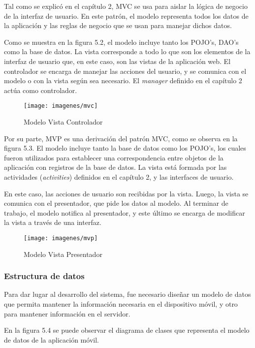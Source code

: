 Tal como se explicó en el capítulo 2, MVC se usa para aislar la lógica de negocio de la interfaz de usuario. En este patrón, el modelo representa todos los datos de la aplicación y las reglas de negocio que se usan para manejar dichos datos. 

Como se muestra en la figura 5.2, el modelo incluye tanto los POJO's, DAO's como la base de datos. La vista corresponde a todo lo que son los elementos de la interfaz de usuario que, en este caso, son las vistas de la aplicación web. El controlador se encarga de manejar las acciones del usuario, y se comunica con el modelo o con la vista según sea necesario. El \textit{manager} definido en el capítulo 2 actúa como controlador.

\begin{figure}[ht]
  \centering
  \texttt{[image: imagenes/mvc]}
  \caption{Modelo Vista Controlador}
  \label{fig:mvc}
\end{figure}

Por su parte, MVP es una derivación del patrón MVC, como se observa en la figura 5.3. El modelo incluye tanto la base de datos como los POJO's, los cuales fueron utilizados para establecer una correspondencia entre objetos de la aplicación con registros de la base de datos. La vista está formada por las actividades (\textit{activities}) definidos en el capítulo 2, y las interfaces de usuario.
 
En este caso, las acciones de usuario son recibidas por la vista. Luego, la vista se comunica con el presentador, que pide los datos al modelo. Al terminar de trabajo, el modelo notifica al presentador, y este último se encarga de modificar la vista a través de una interfaz.

\begin{figure}[ht]
  \centering
  \texttt{[image: imagenes/mvp]}
  \caption{Modelo Vista Presentador}
  \label{fig:mvp}
\end{figure}

\subsubsection{Estructura de datos}

Para dar lugar al desarrollo del sistema, fue necesario diseñar un modelo de datos que permita mantener la información necesaria en el dispositivo móvil, y otro para mantener información en el servidor.

En la figura 5.4 se puede observar el diagrama de clases que representa el modelo de datos de la aplicación móvil. 

